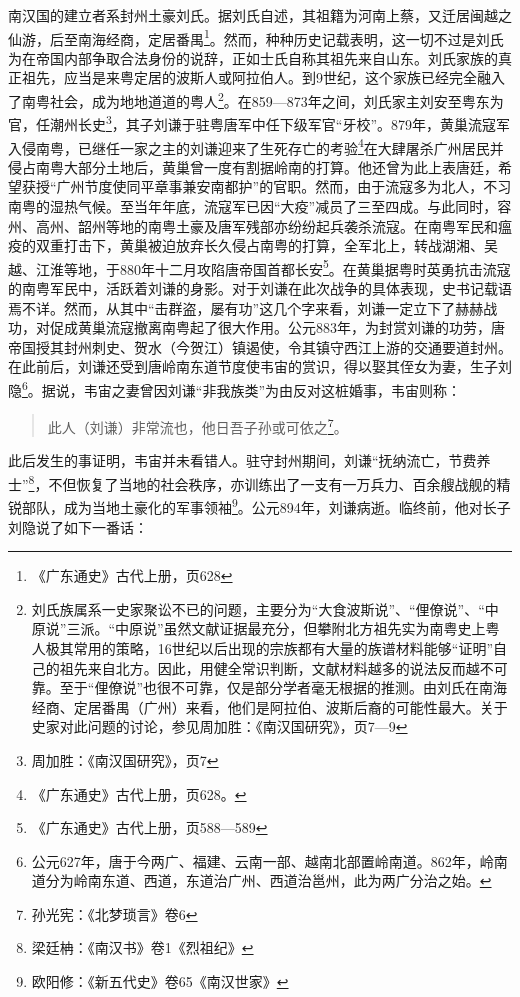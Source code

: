 南汉国的建立者系封州土豪刘氏。据刘氏自述，其祖籍为河南上蔡，又迁居闽越之仙游，后至南海经商，定居番禺\footnote{《广东通史》古代上册，页628}。然而，种种历史记载表明，这一切不过是刘氏为在帝国内部争取合法身份的说辞，正如士氏自称其祖先来自山东。刘氏家族的真正祖先，应当是来粤定居的波斯人或阿拉伯人。到9世纪，这个家族已经完全融入了南粤社会，成为地地道道的粤人\footnote{刘氏族属系一史家聚讼不已的问题，主要分为“大食波斯说”、“俚僚说”、“中原说”三派。“中原说”虽然文献证据最充分，但攀附北方祖先实为南粤史上粤人极其常用的策略，16世纪以后出现的宗族都有大量的族谱材料能够“证明”自己的祖先来自北方。因此，用健全常识判断，文献材料越多的说法反而越不可靠。至于“俚僚说”也很不可靠，仅是部分学者毫无根据的推测。由刘氏在南海经商、定居番禺（广州）来看，他们是阿拉伯、波斯后裔的可能性最大。关于史家对此问题的讨论，参见周加胜：《南汉国研究》，页7—9}。在859—873年之间，刘氏家主刘安至粤东为官，任潮州长史\footnote{周加胜：《南汉国研究》，页7}，其子刘谦于驻粤唐军中任下级军官“牙校”。879年，黄巢流寇军入侵南粤，已继任一家之主的刘谦迎来了生死存亡的考验\footnote{《广东通史》古代上册，页628。}在大肆屠杀广州居民并侵占南粤大部分土地后，黄巢曾一度有割据岭南的打算。他还曾为此上表唐廷，希望获授“广州节度使同平章事兼安南都护”的官职。然而，由于流寇多为北人，不习南粤的湿热气候。至当年年底，流寇军已因“大疫”减员了三至四成。与此同时，容州、高州、韶州等地的南粤土豪及唐军残部亦纷纷起兵袭杀流寇。在南粤军民和瘟疫的双重打击下，黄巢被迫放弃长久侵占南粤的打算，全军北上，转战湖湘、吴越、江淮等地，于880年十二月攻陷唐帝国首都长安\footnote{《广东通史》古代上册，页588—589}。在黄巢据粤时英勇抗击流寇的南粤军民中，活跃着刘谦的身影。对于刘谦在此次战争的具体表现，史书记载语焉不详。然而，从其中“击群盗，屡有功”这几个字来看，刘谦一定立下了赫赫战功，对促成黄巢流寇撤离南粤起了很大作用。公元883年，为封赏刘谦的功劳，唐帝国授其封州刺史、贺水（今贺江）镇遏使，令其镇守西江上游的交通要道封州。在此前后，刘谦还受到唐岭南东道节度使韦宙的赏识，得以娶其侄女为妻，生子刘隐\footnote{公元627年，唐于今两广、福建、云南一部、越南北部置岭南道。862年，岭南道分为岭南东道、西道，东道治广州、西道治邕州，此为两广分治之始。}。据说，韦宙之妻曾因刘谦“非我族类”为由反对这桩婚事，韦宙则称：

\begin{quote}

此人（刘谦）非常流也，他日吾子孙或可依之\footnote{孙光宪：《北梦琐言》卷6}。

\end{quote}

此后发生的事证明，韦宙并未看错人。驻守封州期间，刘谦“抚纳流亡，节费养士”\footnote{梁廷柟：《南汉书》卷1《烈祖纪》}，不但恢复了当地的社会秩序，亦训练出了一支有一万兵力、百余艘战舰的精锐部队，成为当地土豪化的军事领袖\footnote{欧阳修：《新五代史》卷65《南汉世家》}。公元894年，刘谦病逝。临终前，他对长子刘隐说了如下一番话：

